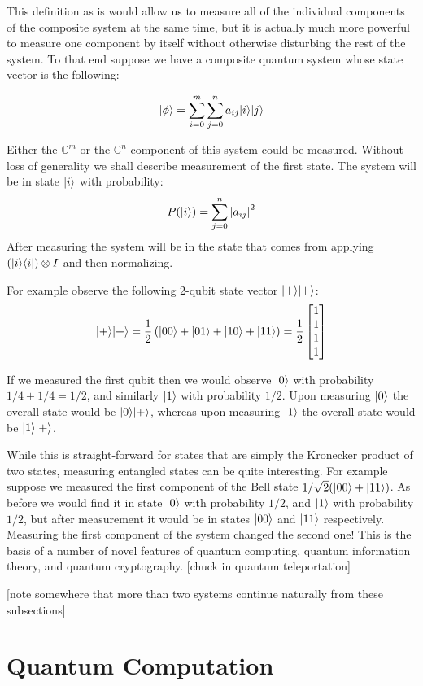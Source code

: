 This definition as is would allow us to measure all of the individual components of the composite system at the same time, but it is actually much more powerful to measure one component by itself without otherwise disturbing the rest of the system. To that end suppose we have a composite quantum system whose state vector is the following:

\[| \phi \rangle = \sum_{i=0}^m\sum_{j=0}^n a_{ij}| i \rangle| j \rangle\]

Either the $\mathbb{C}^m$ or the $\mathbb{C}^n$ component of this system could be measured. Without loss of generality we shall describe measurement of the first state. The system will be in state $| i \rangle$ with probability:
\[P(| i \rangle) = \sum_{j=0}^n\left| a_{ij} \right|^2\]
After measuring the system will be in the state that comes from applying $(| i \rangle\langle i |)\otimes I$ and then normalizing.

For example observe the following 2-qubit state vector $| + \rangle| + \rangle$:
\[| + \rangle| + \rangle=\frac{1}{2}\left(| 00 \rangle+| 01 \rangle+| 10 \rangle+| 11 \rangle\right)=\frac{1}{2}\left[\begin{matrix}
1\\
1\\
1\\
1
\end{matrix}\right]\]

If we measured the first qubit then we would observe $| 0 \rangle$ with probability $1/4+1/4 = 1/2$, and similarly $| 1 \rangle$ with probability $1/2$. Upon measuring $| 0 \rangle$ the overall state would be $| 0 \rangle| + \rangle$, whereas upon measuring $| 1 \rangle$ the overall state would be $| 1 \rangle| + \rangle$.

While this is straight-forward for states that are simply the Kronecker product of two states, measuring entangled states can be quite interesting. For example suppose we measured the first component of the Bell state $1/\sqrt{2}(| 00 \rangle+| 11 \rangle)$. As before we would find it in state $| 0 \rangle$ with probability $1/2$, and $| 1 \rangle$ with probability $1/2$, but after measurement it would be in states $| 00 \rangle$ and $| 11 \rangle$ respectively. Measuring the first component of the system changed the second one! This is the basis of a number of novel features of quantum computing, quantum information theory, and quantum cryptography. [chuck in quantum teleportation]

[note somewhere that more than two systems continue naturally from these subsections]

\section{Quantum Computation}

